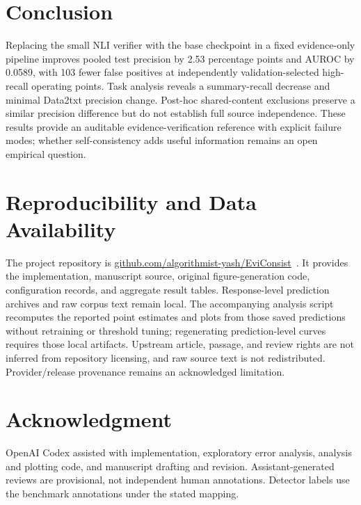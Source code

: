 \documentclass[conference,a4paper]{IEEEtran}
\begin{document}
\section{Conclusion}
Replacing the small NLI verifier with the base checkpoint in a fixed evidence-only pipeline improves pooled test precision by 2.53 percentage points and AUROC by 0.0589, with 103 fewer false positives at independently validation-selected high-recall operating points. Task analysis reveals a summary-recall decrease and minimal Data2txt precision change. Post-hoc shared-content exclusions preserve a similar precision difference but do not establish full source independence. These results provide an auditable evidence-verification reference with explicit failure modes; whether self-consistency adds useful information remains an open empirical question.

\section*{Reproducibility and Data Availability}
The project repository is \href{https://github.com/algorithmist-yash/EviConsist}{github.com/algorithmist-yash/EviConsist}~\cite{repository}. It provides the implementation, manuscript source, original figure-generation code, configuration records, and aggregate result tables. Response-level prediction archives and raw corpus text remain local. The accompanying analysis script recomputes the reported point estimates and plots from those saved predictions without retraining or threshold tuning; regenerating prediction-level curves requires those local artifacts. Upstream article, passage, and review rights are not inferred from repository licensing, and raw source text is not redistributed. Provider/release provenance remains an acknowledged limitation.

\section*{Acknowledgment}
OpenAI Codex assisted with implementation, exploratory error analysis, analysis and plotting code, and manuscript drafting and revision. Assistant-generated reviews are provisional, not independent human annotations. Detector labels use the benchmark annotations under the stated mapping.
\end{document}
